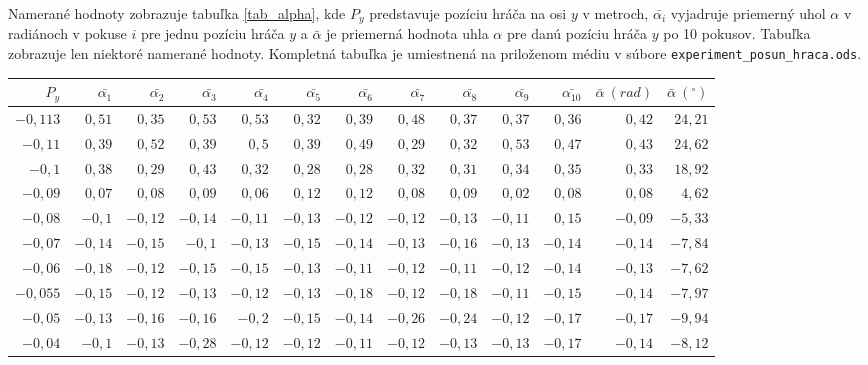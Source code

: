 Namerané hodnoty zobrazuje tabuľka \ref{tab_alpha}, kde $P_y$ predstavuje pozíciu hráča na osi $y$ v metroch, $\bar{\alpha_{i}}$ 
vyjadruje priemerný uhol $\alpha$ v radiánoch v pokuse $i$ pre jednu pozíciu hráča $y$ a $\bar{\alpha}$ je priemerná hodnota uhla $\alpha$ pre danú pozíciu hráča $y$ po 10 pokusov. Tabuľka zobrazuje len niektoré namerané hodnoty. Kompletná tabuľka je umiestnená na priloženom médiu v súbore \newline\texttt{experiment\_posun\_hraca.ods}.
\begin{table}[H]
\centering
\tiny
\begin{tabu}{||r||r|r|r|r|r|r|r|r|r|r||r|r||}
	\hline
	\hline
  $P_y$ & $\bar{\alpha_1}$ & $\bar{\alpha_2}$ & $\bar{\alpha_3}$ & $\bar{\alpha_4}$ & $\bar{\alpha_5}$ & $\bar{\alpha_6}$ & $\bar{\alpha_7}$ & $\bar{\alpha_8}$ & $\bar{\alpha_9}$ & $\bar{\alpha_{10}}$ & $\bar{\alpha}~(rad)$ & $\bar{\alpha}~(^{\circ})$\\
 \hline
 \hline
 $-0,113$ & $0,51$ & $0,35$ & $0,53$ & $0,53$ & $0,32$ & $0,39$ & $0,48$ & $0,37$ & $0,37$ & $0,36$ & $0,42$ & $24,21$ \\
 \hline
 $-0,11$ & $0,39$ & $0,52$ & $0,39$ & $0,5$ & $0,39$ & $0,49$ & $0,29$ & $0,32$ & $0,53$ & $0,47$ & $0,43$ & $24,62$ \\
  \hline
 $-0,1$ & $0,38$ & $0,29$ & $0,43$ & $0,32$ & $0,28$ & $0,28$ & $0,32$ & $0,31$ & $0,34$ & $0,35$ & $0,33$ & $18,92$ \\
  \hline
 $-0,09$ & $0,07$ & $0,08$ & $0,09$ & $0,06$ & $0,12$ & $0,12$ & $0,08$ & $0,09$ & $0,02$ & $0,08$ & $0,08$ & $4,62$ \\
  \hline
 $-0,08$ & $-0,1$ & $-0,12$ & $-0,14$ & $-0,11$ & $-0,13$ & $-0,12$ & $-0,12$ & $-0,13$ & $-0,11$ & $0,15$ & $-0,09$ & $-5,33$ \\
  \hline
 $-0,07$ & $-0,14$ & $-0,15$ & $-0,1$ & $-0,13$ & $-0,15$ & $-0,14$ & $-0,13$ & $-0,16$ & $-0,13$ & $-0,14$ & $-0,14$ & $-7,84$ \\
  \hline
 $-0,06$ & $-0,18$ & $-0,12$ & $-0,15$ & $-0,15$ & $-0,13$ & $-0,11$ & $-0,12$ & $-0,11$ & $-0,12$ & $-0,14$ & $-0,13$ & $-7,62$ \\
  \hline
 $-0,055$ & $-0,15$ & $-0,12$ & $-0,13$ & $-0,12$ & $-0,13$ & $-0,18$ & $-0,12$ & $-0,18$ & $-0,11$ & $-0,15$ & $-0,14$ & $-7,97$ \\
  \hline
 $-0,05$ & $-0,13$ & $-0,16$ & $-0,16$ & $-0,2$ & $-0,15$ & $-0,14$ & $-0,26$ & $-0,24$ & $-0,12$ & $-0,17$ & $-0,17$ & $-9,94$\\
  \hline
 $-0,04$ & $-0,1$ & $-0,13$ & $-0,28$ & $-0,12$ & $-0,12$ & $-0,11$ & $-0,12$ & $-0,13$ & $-0,13$ & $-0,17$ & $-0,14$ & $-8,12$ \\

\end{tabu}
\end{table}
